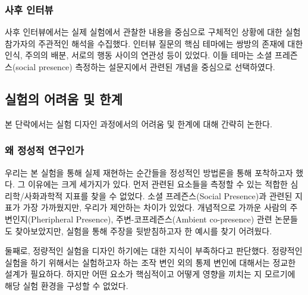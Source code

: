 \subsubsection{사후 인터뷰}

사후 인터뷰에서는 실제 실험에서 관찰한 내용을 중심으로 구체적인 상황에 대한 실험 참가자의 주관적인 해석을 수집했다. 인터뷰 질문의 핵심 테마에는 쌍방의 존재에 대한 인식, 주의의 배분, 서로의 행동 사이의 연관성 등이 있었다. 이들 테마는 소셜 프레즌스(social presence) 측정하는 설문지\cite{biocca2001networked}에서  관련된 개념을 중심으로 선택하였다.


\subsection{실험의 어려움 및 한계}


본 단락에서는 실험 디자인 과정에서의 어려움 및 한계에 대해 간략히 논한다.


\subsubsection{왜 정성적 연구인가}

우리는 본 실험을 통해 \sysname\이 실제 \concept\를 재현하는 순간들을 정성적인 방법론을 통해 포착하고자 했다. 그 이유에는 크게 세가지가 있다. 먼저  관련된 요소들을 측정할 수 있는 적합한 심리학/사화과학적 지표를 찾을 수 없었다. 소셜 프레즌스(Social Presence)과 관련된 지표\cite{biocca2001networked}가 가장 가까웠지만, 우리가 제안하는  차이가 있었다. 개념적으로 가까운 사람의 주변인지(Pheripheral Presence), 주변-코프레즌스(Ambient co-presence) 관련 논문들도 찾아보았지만, 실험을 통해 주장을 뒷받침하고자 한 예시를 찾기 어려웠다.

둘째로, 정량적인 실험을 디자인 하기에는  대한 지식이 부족하다고 판단했다. 정량적인 실험을 하기 위해서는 실험하고자 하는 조작 변인 외의 통제 변인에 대해서는 정교한 설계가 필요하다. 하지만 어떤 요소가 핵심적이고  어떻게 영향을 끼치는 지 모르기에 해당 실험 환경을 구성할 수 없었다.

